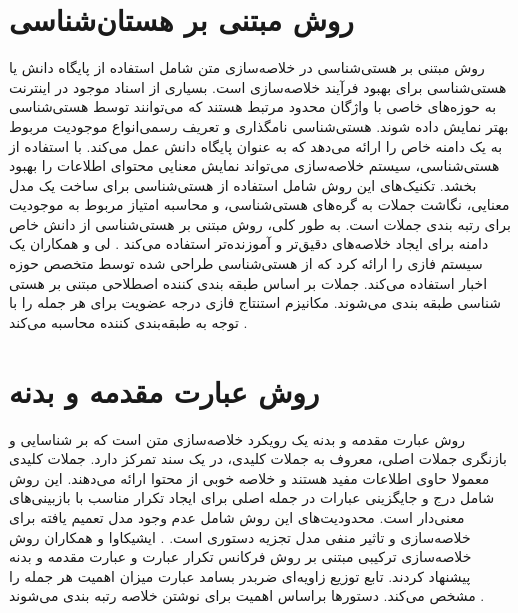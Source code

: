 \section{روش مبتنی بر هستان‌شناسی}
روش مبتنی بر هستی‌شناسی در خلاصه‌سازی متن شامل استفاده از پایگاه دانش یا هستی‌شناسی برای بهبود فرآیند خلاصه‌سازی است. بسیاری از اسناد موجود در اینترنت به حوزه‌های خاصی با واژگان محدود مرتبط هستند که می‌توانند توسط هستی‌شناسی بهتر نمایش داده شوند. هستی‌شناسی نامگذاری و تعریف رسمی‌انواع موجودیت مربوط به یک دامنه خاص را ارائه می‌دهد که به عنوان پایگاه دانش عمل می‌کند. با استفاده از هستی‌شناسی، سیستم خلاصه‌سازی می‌تواند نمایش معنایی محتوای اطلاعات را بهبود بخشد. تکنیک‌های این روش شامل استفاده از هستی‌شناسی برای ساخت یک مدل معنایی، نگاشت جملات به گره‌های هستی‌شناسی، و محاسبه امتیاز مربوط به موجودیت برای رتبه بندی جملات است. به طور کلی، روش مبتنی بر هستی‌شناسی از دانش خاص دامنه برای ایجاد خلاصه‌های دقیق‌تر و آموزنده‌تر استفاده می‌کند
\cite{andhale2016overview}.
لی و همکاران  یک سیستم فازی را ارائه کرد که از هستی‌شناسی طراحی شده توسط متخصص حوزه اخبار استفاده می‌کند. جملات بر اساس طبقه بندی کننده اصطلاحی مبتنی بر هستی شناسی طبقه بندی می‌شوند. مکانیزم استنتاج فازی درجه عضویت برای هر جمله را با توجه به طبقه‌بندی کننده محاسبه می‌کند
\cite{lee2005fuzzy}.

\section{روش  عبارت مقدمه و بدنه}

روش عبارت مقدمه و بدنه یک رویکرد خلاصه‌سازی متن است که بر شناسایی و بازنگری جملات اصلی، معروف به جملات کلیدی، در یک سند تمرکز دارد. جملات کلیدی معمولا حاوی اطلاعات مفید هستند و خلاصه خوبی از محتوا ارائه می‌دهند. این روش شامل درج و جایگزینی عبارات در جمله اصلی برای ایجاد تکرار مناسب با بازبینی‌های معنی‌دار است. محدودیت‌های این روش شامل عدم وجود مدل تعمیم یافته برای خلاصه‌سازی و تاثیر منفی مدل تجزیه دستوری است.
\cite{andhale2016overview}.
ایشیکاوا و همکاران  روش خلاصه‌سازی ترکیبی مبتنی بر روش فرکانس تکرار عبارت
و عبارت مقدمه و بدنه پیشنهاد کردند. تابع توزیع زاویه‌ای ضربدر بسامد عبارت  میزان اهمیت هر جمله را مشخص می‌کند. دستورها براساس اهمیت برای نوشتن خلاصه رتبه بندی می‌شوند
\cite{Ishikawa2001HybridTS}.

